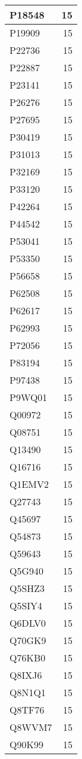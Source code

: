 \documentclass[
]{book}
\theoremstyle{definition}
\theoremstyle{definition}
\theoremstyle{definition}
\theoremstyle{definition}
\theoremstyle{remark}
\begin{document}
\begin{table}
\begin{tabular}{l|r}
\hline
P18548 & 15\\
\hline
P19909 & 15\\
\hline
P22736 & 15\\
\hline
P22887 & 15\\
\hline
P23141 & 15\\
\hline
P26276 & 15\\
\hline
P27695 & 15\\
\hline
P30419 & 15\\
\hline
P31013 & 15\\
\hline
P32169 & 15\\
\hline
P33120 & 15\\
\hline
P42264 & 15\\
\hline
P44542 & 15\\
\hline
P53041 & 15\\
\hline
P53350 & 15\\
\hline
P56658 & 15\\
\hline
P62508 & 15\\
\hline
P62617 & 15\\
\hline
P62993 & 15\\
\hline
P72056 & 15\\
\hline
P83194 & 15\\
\hline
P97438 & 15\\
\hline
P9WQ01 & 15\\
\hline
Q00972 & 15\\
\hline
Q08751 & 15\\
\hline
Q13490 & 15\\
\hline
Q16716 & 15\\
\hline
Q1EMV2 & 15\\
\hline
Q27743 & 15\\
\hline
Q45697 & 15\\
\hline
Q54873 & 15\\
\hline
Q59643 & 15\\
\hline
Q5G940 & 15\\
\hline
Q5SHZ3 & 15\\
\hline
Q5SIY4 & 15\\
\hline
Q6DLV0 & 15\\
\hline
Q70GK9 & 15\\
\hline
Q76KB0 & 15\\
\hline
Q8IXJ6 & 15\\
\hline
Q8N1Q1 & 15\\
\hline
Q8TF76 & 15\\
\hline
Q8WVM7 & 15\\
\hline
Q90K99 & 15\\

\end{tabular}
\end{table}
\end{document}
